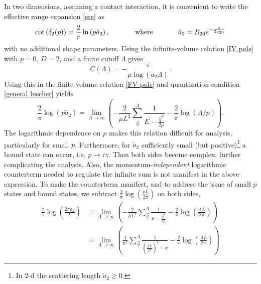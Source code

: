 In two dimensions, assuming a contact interaction, it is convenient to write the effective range expansion \eqref{ere} as
\begin{equation}
    \cot \left(\delta_{2}(p)\right)
    =
    \frac{2}{\pi} \ln \left(p \tilde a_{2}\right),
%
    \hspace{0.5in}
    \text{where}
    \hspace{0.5in}
%
    \tilde a_{2}
    =
    R_{20}e^{-\frac{\pi}{2 a_{20}}}
\end{equation}
with no additional shape parameters.
Using the infinite-volume relation \eqref{IV pole} with $p=0$, $D=2$, and a finite cutoff $\Lambda$ gives
\begin{equation}\label{eq:C2}
    C(\Lambda)
    =
    -\frac{\pi}{\mu \log \left(\tilde a_{2} \Lambda\right)}.
\end{equation}
Using this in the finite-volume relation \eqref{FV pole} and quantization condition \eqref{general luscher} yields
\begin{equation}\label{eq:first 2d}
    \frac{2}{\pi} \log \left(p\tilde a_{2}\right)
    =
    \lim_{\Lambda\to\infty}
    \left(
        -\frac{2}{\mu L^{2}} \sum_{\vec{q}}^{\Lambda} \frac{1}{E-\frac{\vec{q}^{2}}{2\mu}}
        -\frac{2}{\pi} \log (\Lambda / p)
    \right).
\end{equation}
The logarithmic dependence on $p$ makes this relation difficult for analysis, particularly for small $p$.
Furthermore, for $\tilde a_{2}$ sufficiently small (but positive)\footnote{
    In 2-d the scattering length $\tilde a_{2}\ge 0$\cite{}.
} a bound state can occur, i.e. $p\to i\gamma$.
Then both sides become complex, further complicating the analysis.
Also, the momentum-\emph{independent} logarithmic counterterm needed to regulate the infinite sum is not manifest in the above expression.
To make the counterterm manifest, and to address the issue of small $p$ states and bound states, we subtract $\frac{2}{\pi}\log\left(\frac{pL}{2\pi}\right)$ on both sides,
\begin{align}
    \frac{2}{\pi} \log \left(\frac{2\pi \tilde a_{2}}{L}\right)
    &=
    \lim_{\Lambda\to\infty}
    \left(
        -\frac{2}{\mu L^{2}} \sum_{\vec{q}}^{\Lambda} \frac{1}{E-\frac{\vec{q}^{2}}{2\mu}}
        -\frac{2}{\pi} \log \left(\frac{\Lambda L}{2\pi}\right)
    \right)
    \nonumber\\
    &=
    \lim_{\Lambda\to\infty}
    \left(
        \frac{1}{\pi^2} \sum_{\vec{q}}^{\Lambda} \frac{1}{\left(\frac{\vec{q}L}{2\pi}\right)^2-x}-\frac{2}{\pi} \log \left(\frac{\Lambda L}{2\pi}\right)
    \right)
    \label{eq:second 2d}
\end{align}

